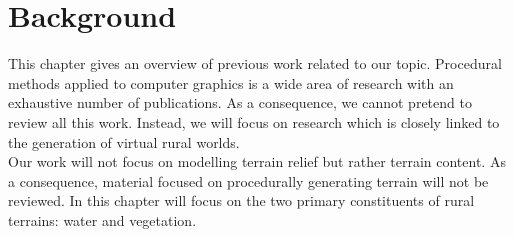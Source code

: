 
\chapter{Background}

This chapter gives an overview of previous work related to our topic. Procedural methods applied to computer graphics is a wide area of research with an exhaustive number of publications. As a consequence, we cannot pretend to review all this work. Instead, we will focus on research which is closely linked to the generation of virtual rural worlds. \\

Our work will not focus on modelling terrain relief but rather terrain content. As a consequence, material focused on procedurally generating terrain will not be reviewed. In this chapter will focus on the two primary constituents of rural terrains: water and vegetation.